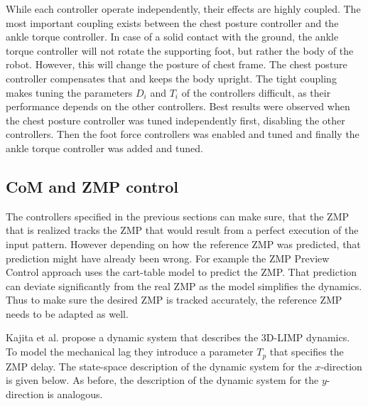 \documentclass[english,ngerman]{KITreprt}
\begin{document}
While each controller operate independently, their effects are highly
coupled. The most important coupling exists between the chest posture
controller and the ankle torque controller. In case of a solid contact
with the ground, the ankle torque controller will not rotate the
supporting foot, but rather the body of the robot. However, this will
change the posture of chest frame. The chest posture controller
compensates that and keeps the body upright. The tight coupling makes
tuning the parameters $D_i$ and $T_i$ of the controllers difficult, as
their performance depends on the other controllers. Best results were
observed when the chest posture controller was tuned independently
first, disabling the other controllers. Then the foot force controllers
was enabled and tuned and finally the ankle torque controller was added
and tuned.

\subsection{CoM and ZMP control}\label{com-and-zmp-control}

The controllers specified in the previous sections can make sure, that
the ZMP that is realized tracks the ZMP that would result from a perfect
execution of the input pattern. However depending on how the reference
ZMP was predicted, that prediction might have already been wrong. For
example the ZMP Preview Control approach uses the cart-table model to
predict the ZMP. That prediction can deviate significantly from the real
ZMP as the model simplifies the dynamics. Thus to make sure the desired
ZMP is tracked accurately, the reference ZMP needs to be adapted as
well.

Kajita et al. propose a dynamic system that describes the 3D-LIMP
dynamics. To model the mechanical lag they introduce a parameter $T_p$
that specifies the ZMP delay. The state-space description of the dynamic
system for the $x$-direction is given below. As before, the description
of the dynamic system for the $y$-direction is analogous.
\end{document}
